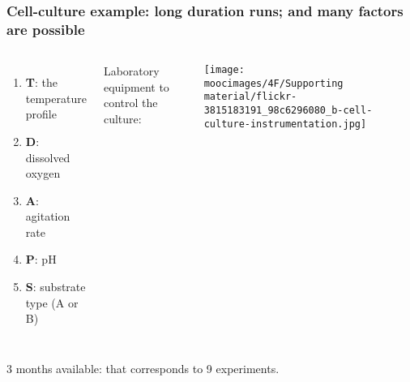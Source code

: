 \documentclass[handout,11pt,aspectratio=169,mathserif]{beamer}
\begin{document}
\begin{frame}\frametitle{Cell-culture example: long duration runs; and many factors are possible}
	\begin{columns}[c]
			\begin{enumerate}
				\item	\textbf{T}: the temperature profile
				\item	\textbf{D}: dissolved oxygen
				\item	\textbf{A}: agitation rate
				\item	\textbf{P}: pH
				\item	\textbf{S}: substrate type (A or B)
			\end{enumerate}
		
			{\color{blue} \small Laboratory equipment to control the culture:} 
			
			\vspace{0.2cm}
			
			\centerline{\texttt{[image: \\moocimages/4F/Supporting material/flickr-3815183191\_98c6296080\_b-cell-culture-instrumentation.jpg]}}
	\end{columns}

	\vfill
	3 months available: {\color{myOrange} that corresponds to 9 experiments}.
	
\end{frame}
\end{document}
